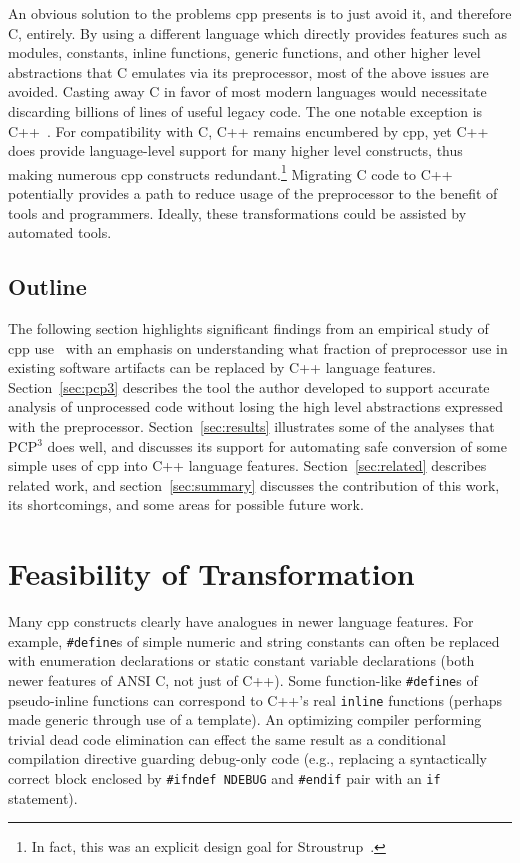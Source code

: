 \documentclass{article}
\newcommand{\pcp}{\mbox{\textsf{PCP}$^3$}}
\newcommand{\Cpp}{\mbox{\textsf{cpp}}}
\newcommand{\CPP}{\mbox{\textsf{C++}}}
\newcommand{\C}{\mbox{\textsf{C}}}
\newcommand{\ppd}[1]{\texttt{\##1}}
\begin{document}
An obvious solution to the problems \Cpp{} presents is to just avoid it,
and therefore \C{}, entirely.  By using a different language which
directly provides features such as modules, constants, inline functions,
generic functions, and other higher level abstractions that \C{}
emulates via its preprocessor, most of the above issues are avoided.
Casting away \C{} in favor of most modern languages would necessitate
discarding billions of lines of useful legacy code.  The one notable
exception is \CPP{}~\cite{CD2DraftStandard}. For compatibility with
\C{}, \CPP{} remains encumbered by \Cpp{}, yet \CPP{} does provide
language-level support for many higher level constructs, thus making
numerous \Cpp{} constructs redundant.\footnote{In fact, this was an
  explicit design goal for Stroustrup~\cite[p.~424]{Stroustrup94}.}
Migrating \C{} code to \CPP{} potentially provides a path to reduce
usage of the preprocessor to the benefit of tools and programmers.
Ideally, these transformations could be assisted by automated tools.

\subsection{Outline}

The following section highlights significant findings from an empirical
study of \Cpp{} use~\cite{EmpCpp-TR} with an emphasis on understanding
what fraction of preprocessor use in existing software artifacts can be
replaced by \CPP{} language features.  Section~\ref{sec:pcp3} describes
the tool the author developed to support accurate analysis of
unprocessed code without losing the high level abstractions expressed
with the preprocessor. Section~\ref{sec:results} illustrates some of the
analyses that \pcp{} does well, and discusses its support for automating
safe conversion of some simple uses of \Cpp{} into \CPP{} language
features. Section~\ref{sec:related} describes related work, and
section~\ref{sec:summary} discusses the contribution of this work, its
shortcomings, and some areas for possible future work.


\section{Feasibility of Transformation}
\label{sec:feasibility}
Many \Cpp{} constructs clearly have analogues in newer language
features.  For example, \ppd{define}s of simple numeric and string
constants can often be replaced with enumeration declarations or static
constant variable declarations (both newer features of ANSI
\C{}, not just of \CPP{}).
Some function-like \ppd{define}s of pseudo-inline functions can
correspond to \CPP{}'s real \texttt{inline} functions (perhaps made
generic through use of a template).  An optimizing compiler performing
trivial dead code elimination can effect the same result as a
conditional compilation directive guarding debug-only code (e.g.,
replacing a syntactically correct block enclosed by \texttt{\ppd{ifndef}
  NDEBUG} and \ppd{endif} pair with an \texttt{if} statement).
\end{document}
